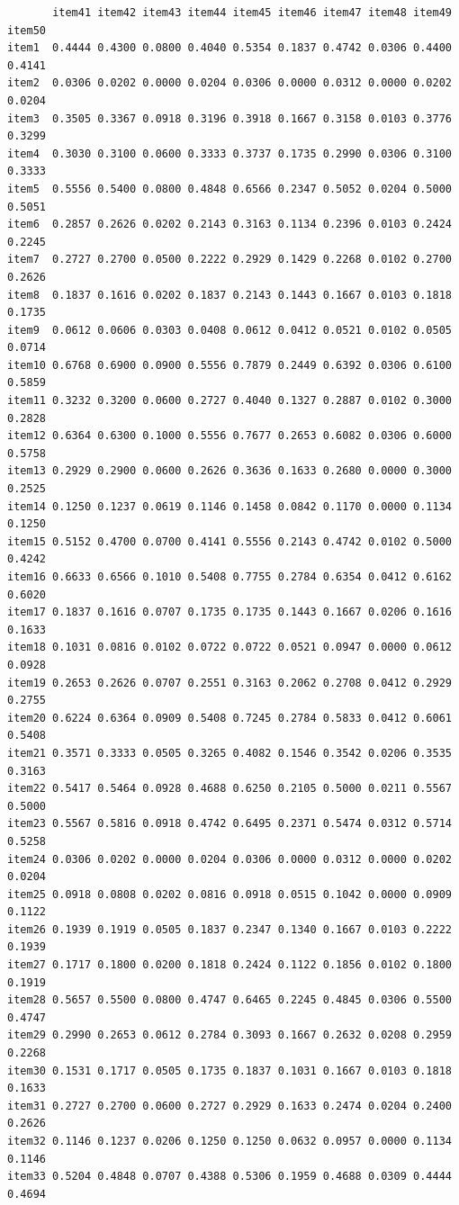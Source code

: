 \documentclass[
  a4paper,
]{ltjsbook}
\begin{document}
\begin{verbatim}
       item41 item42 item43 item44 item45 item46 item47 item48 item49 item50
item1  0.4444 0.4300 0.0800 0.4040 0.5354 0.1837 0.4742 0.0306 0.4400 0.4141
item2  0.0306 0.0202 0.0000 0.0204 0.0306 0.0000 0.0312 0.0000 0.0202 0.0204
item3  0.3505 0.3367 0.0918 0.3196 0.3918 0.1667 0.3158 0.0103 0.3776 0.3299
item4  0.3030 0.3100 0.0600 0.3333 0.3737 0.1735 0.2990 0.0306 0.3100 0.3333
item5  0.5556 0.5400 0.0800 0.4848 0.6566 0.2347 0.5052 0.0204 0.5000 0.5051
item6  0.2857 0.2626 0.0202 0.2143 0.3163 0.1134 0.2396 0.0103 0.2424 0.2245
item7  0.2727 0.2700 0.0500 0.2222 0.2929 0.1429 0.2268 0.0102 0.2700 0.2626
item8  0.1837 0.1616 0.0202 0.1837 0.2143 0.1443 0.1667 0.0103 0.1818 0.1735
item9  0.0612 0.0606 0.0303 0.0408 0.0612 0.0412 0.0521 0.0102 0.0505 0.0714
item10 0.6768 0.6900 0.0900 0.5556 0.7879 0.2449 0.6392 0.0306 0.6100 0.5859
item11 0.3232 0.3200 0.0600 0.2727 0.4040 0.1327 0.2887 0.0102 0.3000 0.2828
item12 0.6364 0.6300 0.1000 0.5556 0.7677 0.2653 0.6082 0.0306 0.6000 0.5758
item13 0.2929 0.2900 0.0600 0.2626 0.3636 0.1633 0.2680 0.0000 0.3000 0.2525
item14 0.1250 0.1237 0.0619 0.1146 0.1458 0.0842 0.1170 0.0000 0.1134 0.1250
item15 0.5152 0.4700 0.0700 0.4141 0.5556 0.2143 0.4742 0.0102 0.5000 0.4242
item16 0.6633 0.6566 0.1010 0.5408 0.7755 0.2784 0.6354 0.0412 0.6162 0.6020
item17 0.1837 0.1616 0.0707 0.1735 0.1735 0.1443 0.1667 0.0206 0.1616 0.1633
item18 0.1031 0.0816 0.0102 0.0722 0.0722 0.0521 0.0947 0.0000 0.0612 0.0928
item19 0.2653 0.2626 0.0707 0.2551 0.3163 0.2062 0.2708 0.0412 0.2929 0.2755
item20 0.6224 0.6364 0.0909 0.5408 0.7245 0.2784 0.5833 0.0412 0.6061 0.5408
item21 0.3571 0.3333 0.0505 0.3265 0.4082 0.1546 0.3542 0.0206 0.3535 0.3163
item22 0.5417 0.5464 0.0928 0.4688 0.6250 0.2105 0.5000 0.0211 0.5567 0.5000
item23 0.5567 0.5816 0.0918 0.4742 0.6495 0.2371 0.5474 0.0312 0.5714 0.5258
item24 0.0306 0.0202 0.0000 0.0204 0.0306 0.0000 0.0312 0.0000 0.0202 0.0204
item25 0.0918 0.0808 0.0202 0.0816 0.0918 0.0515 0.1042 0.0000 0.0909 0.1122
item26 0.1939 0.1919 0.0505 0.1837 0.2347 0.1340 0.1667 0.0103 0.2222 0.1939
item27 0.1717 0.1800 0.0200 0.1818 0.2424 0.1122 0.1856 0.0102 0.1800 0.1919
item28 0.5657 0.5500 0.0800 0.4747 0.6465 0.2245 0.4845 0.0306 0.5500 0.4747
item29 0.2990 0.2653 0.0612 0.2784 0.3093 0.1667 0.2632 0.0208 0.2959 0.2268
item30 0.1531 0.1717 0.0505 0.1735 0.1837 0.1031 0.1667 0.0103 0.1818 0.1633
item31 0.2727 0.2700 0.0600 0.2727 0.2929 0.1633 0.2474 0.0204 0.2400 0.2626
item32 0.1146 0.1237 0.0206 0.1250 0.1250 0.0632 0.0957 0.0000 0.1134 0.1146
item33 0.5204 0.4848 0.0707 0.4388 0.5306 0.1959 0.4688 0.0309 0.4444 0.4694

\end{verbatim}
\end{document}
